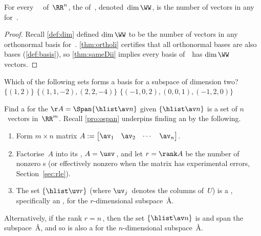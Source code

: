 \begin{theorem} \label{thm:dimii} 
For every ~\WW\ of~\(\RR^n\),  
the  of~\WW, denoted~\(\dim\WW\), is the number of vectors in any  for~\WW. 
\end{theorem}

\begin{proof} 
Recall \autoref{def:dim} defined \(\dim\WW\) to be the number of vectors in any orthonormal basis for~\WW.
\autoref{thm:ortholi} certifies that all orthonormal bases are also bases (\autoref{def:basis}), so \autoref{thm:sameDii} implies every basis of~\WW\ has \(\dim\WW\) vectors.
\end{proof}




\begin{activity}
Which of the following sets forms a basis for a subspace of dimension two?
{\(\{(1,2)\}\)}
{\(\{(1,1,-2),(2,2,-4)\}\)}
{\(\{(-1,0,2),(0,0,1),(-1,2,0)\}\)}
\end{activity}





\begin{procedure} \label{pro:bfs}
Find a  for the  \(\AA=\Span\{\hlist\av n\}\) given $\{\hlist\av n\}$ is a set of $n$~vectors in~\(\RR^m\).
Recall \autoref{pro:ospan} underpins finding an  by the following.
\begin{enumerate}
\item Form \(m\times n\) matrix $A:= \begin{bmatrix} \av_1 & \av_2& \cdots&\av_n \end{bmatrix}$. 
\item Factorise~\(A\) into its \svd, $A=\usv$\,, and let \(r=\rank A\) be the number of nonzero s (or effectively nonzero when the matrix has experimental errors, Section~\ref{sec:rle}).
\item The set \(\{\hlist\uv r\}\)  (where \(\uv_j\)~denotes the columns of~$U$) is a , specifically an , for the \(r\)-dimensional subspace~\AA.
\end{enumerate}
Alternatively, if the rank \(r=n\)\,, then the set \(\{\hlist\av n\}\) is  and span the subspace~\AA, and so is also a  for the \(n\)-dimensional subspace~\AA.
\end{procedure}



